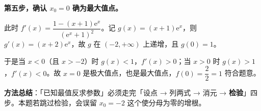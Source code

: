\begin{answer}
\textbf{第五步，确认 $x_0=0$ 确为最大值点。}

此时 $f'(x)=\dfrac{1-(x+1)\mathrm{e}^{x}}{(\mathrm{e}^{x}+1)^2}$。记 $g(x)=(x+1)\mathrm{e}^x$，则 $g'(x)=(x+2)\mathrm{e}^x$，故 $g$ 在 $(-2,+\infty)$ 上递增，且 $g(0)=1$。

于是当 $x<0$（且 $x>-2$）时 $g(x)<1$，$f'(x)>0$；当 $x>0$ 时 $g(x)>1$，$f'(x)<0$。故 $x=0$ 是极大值点，也是最大值点，$f(0)=\dfrac{2}{2}=1$  符合题意。

\begin{gktip}
\textbf{方法总结}：「已知最值反求参数」必须走完「设点 → 列两式 → 消元 → \textbf{检验}」四步。本题若跳过检验，会误留 $x_0=-2$ 这个使分母为零的增根。
\end{gktip}


\par\medskip

\end{answer}
